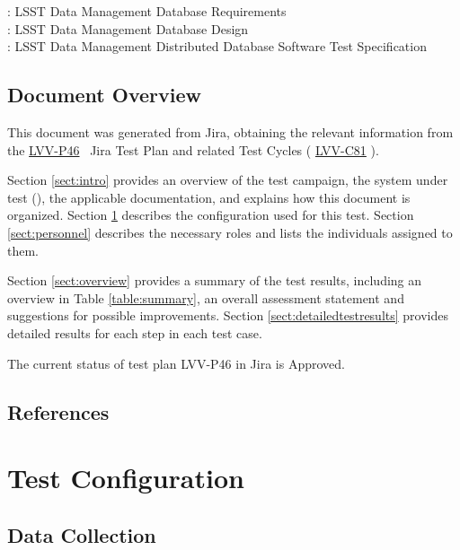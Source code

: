 \documentclass[DM,lsstdraft,STR,toc]{lsstdoc}
\begin{document}
: LSST Data Management Database Requirements\\
: LSST Data Management Database Design\\
: LSST Data Management Distributed Database Software Test
Specification


\subsection{Document Overview}
\label{sect:docoverview}

This document was generated from Jira, obtaining the relevant information from the 
\href{https://jira.lsstcorp.org/secure/Tests.jspa#/testPlan/LVV-P46}{LVV-P46}
~Jira Test Plan and related Test Cycles (
  \href{https://jira.lsstcorp.org/secure/Tests.jspa#/testCycle/LVV-C81}{LVV-C81}
).

Section \ref{sect:intro} provides an overview of the test campaign, the system under test (\product{}), the applicable documentation, and explains how this document is organized.
Section \ref{sect:configuration}  describes the configuration used for this test.
Section \ref{sect:personnel} describes the necessary roles and lists the individuals assigned to them.

Section \ref{sect:overview} provides a summary of the test results, including an overview in Table \ref{table:summary}, an overall assessment statement and suggestions for possible improvements.
Section \ref{sect:detailedtestresults} provides detailed results for each step in each test case.

The current status of test plan LVV-P46 in Jira is Approved.

\subsection{References}
\label{sect:references}
\renewcommand{\refname}{}

\section{Test Configuration}
\label{sect:configuration}

\subsection{Data Collection}
\end{document}
